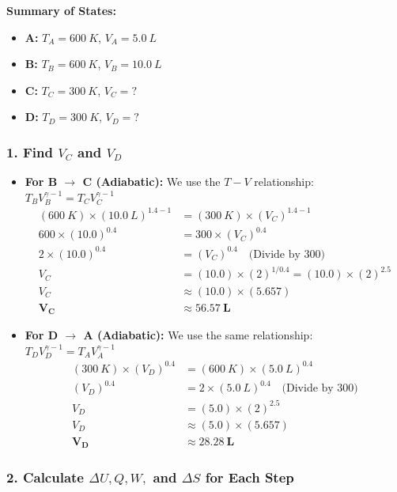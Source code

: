 \documentclass[article]{article}
\begin{document}
\textbf{Summary of States:}
\begin{itemize}
    \item \textbf{A:} $T_A = \SI{600}{K}$, $V_A = \SI{5.0}{L}$
    \item \textbf{B:} $T_B = \SI{600}{K}$, $V_B = \SI{10.0}{L}$
    \item \textbf{C:} $T_C = \SI{300}{K}$, $V_C = ?$
    \item \textbf{D:} $T_D = \SI{300}{K}$, $V_D = ?$
\end{itemize}


\subsubsection{1. Find $V_C$ and $V_D$}
\begin{itemize}
    \item \textbf{For B $\to$ C (Adiabatic):} We use the $T-V$ relationship: $T_B V_B^{\gamma-1} = T_C V_C^{\gamma-1}$
    \begin{align*}
        (\SI{600}{K}) \times (\SI{10.0}{L})^{1.4-1} &= (\SI{300}{K}) \times (V_C)^{1.4-1} \\
        600 \times (10.0)^{0.4} &= 300 \times (V_C)^{0.4} \\
        2 \times (10.0)^{0.4} &= (V_C)^{0.4} \quad \text{(Divide by 300)} \\
        V_C &= (10.0) \times (2)^{1/0.4} = (10.0) \times (2)^{2.5} \\
        V_C &\approx (10.0) \times (5.657) \\
        \mathbf{V_C} &\approx \mathbf{\SI{56.57}{L}}
    \end{align*}

    \item \textbf{For D $\to$ A (Adiabatic):} We use the same relationship: $T_D V_D^{\gamma-1} = T_A V_A^{\gamma-1}$
    \begin{align*}
        (\SI{300}{K}) \times (V_D)^{0.4} &= (\SI{600}{K}) \times (\SI{5.0}{L})^{0.4} \\
        (V_D)^{0.4} &= 2 \times (\SI{5.0}{L})^{0.4} \quad \text{(Divide by 300)} \\
        V_D &= (5.0) \times (2)^{2.5} \\
        V_D &\approx (5.0) \times (5.657) \\
        \mathbf{V_D} &\approx \mathbf{\SI{28.28}{L}}
    \end{align*}
\end{itemize}

\subsubsection{2. Calculate $\Delta U, Q, W,$ and $\Delta S$ for Each Step}
\end{document}
